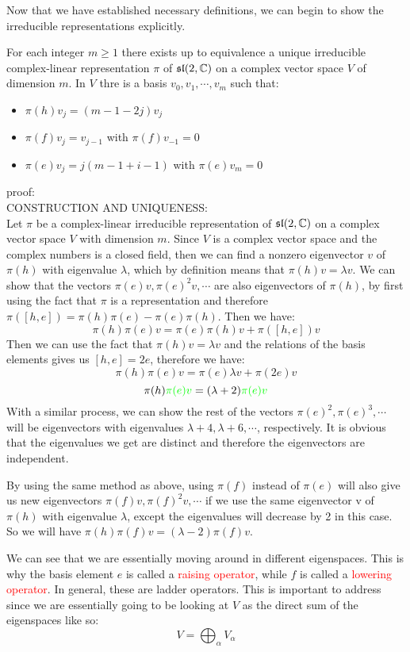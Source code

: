 \documentclass{article}
\begin{document}
Now that we have established necessary definitions, we can begin to show the irreducible representations explicitly. 

\begin{theorem}
For each integer $m\geq 1$ there exists up to equivalence a unique irreducible complex-linear representation $\pi$ of $\mathfrak{sl}(2,\mathbb{C})$ on a complex vector space $V$ of dimension $m$. In $V$ thre is a basis ${v_0,v_1,\cdots,v_{m}}$ such that:
\begin{itemize}
\item $\pi(h)v_j = (m-1 - 2j)v_j$
\item $\pi(f)v_j=v_{j-1}$ with $\pi(f)v_{-1}=0$
\item $\pi(e)v_j = j(m-1+i-1)$ with $\pi(e)v_m =0$
\end{itemize}
\end{theorem}
proof:\\

CONSTRUCTION AND UNIQUENESS:\\
Let $\pi$ be a complex-linear irreducible representation of $\mathfrak{sl}(2,\mathbb{C})$ on a complex vector space $V$ with dimension $m$. Since $V$ is a complex vector space and the complex numbers is a closed field, then we can find a nonzero eigenvector $v$ of $\pi(h)$ with eigenvalue $\lambda$, which by definition means that $\pi(h)v=\lambda v$. 
We can show that the vectors $\pi(e)v,\pi(e)^2v,\cdots$ are also eigenvectors of $\pi(h)$, by first using the fact that $\pi$ is a representation and therefore $\pi([h,e])=\pi(h)\pi(e)-\pi(e)\pi(h)$. Then we have:
$$\pi(h)\pi(e)v = \pi(e)\pi(h)v + \pi([h,e])v $$
Then we can use the fact that $\pi(h)v = \lambda v$ and the relations of the basis elements gives us $[h,e] =2e$, therefore we have:
$$\pi(h)\pi(e)v = \pi(e)\lambda v +\pi(2e)v $$
$$\pi(h)\textcolor{green}{\pi(e)v} = (\lambda + 2)\textcolor{green}{\pi(e)v} $$
With a similar process, we can show the rest of the vectors $\pi(e)^2, \pi(e)^3,\cdots$ will be eigenvectors with eigenvalues $\lambda +4,\lambda +6,\cdots$, respectively. It is obvious that the eigenvalues we get are distinct and therefore the eigenvectors are independent. 

By using the same method as above, using $\pi(f)$ instead of $\pi(e)$ will also give us new eigenvectors $\pi(f)v,\pi(f)^2v,\cdots$ if we use the same eigenvector v of $\pi(h)$ with eigenvalue $\lambda$, except the eigenvalues will decrease by 2 in this case. So we will have $\pi(h)\pi(f)v = (\lambda -2)\pi(f)v$. 

We can see that we are essentially moving around in different eigenspaces. This is why the basis element $e$ is called a \textcolor{red}{raising operator}, while $f$ is called a \textcolor{red}{lowering operator}. In general, these are ladder operators. This is important to address since we are essentially going to be looking at $V$ as the direct sum of the eigenspaces like so: $$V = \bigoplus_{\alpha}V_{\alpha} $$
\end{document}
